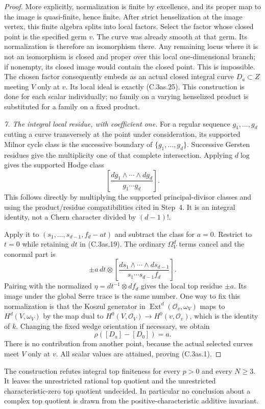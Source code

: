 \begin{proof}
More explicitly, normalization is finite by excellence,
and its proper map to the image is quasi-finite, hence
finite. After strict henselization at the image vertex,
this finite algebra splits into local factors. Select
the factor whose closed point is the specified germ $v$.
The curve was already smooth at that germ. Its normalization
is therefore an isomorphism there. Any remaining locus
where it is not an isomorphism is closed and proper over
this local one-dimensional branch; if nonempty, its closed
image would contain the closed point. This is impossible.
The chosen factor consequently embeds as an actual closed
integral curve $D_a\subset Z$ meeting $V$ only at $v$.
Its local ideal is exactly (C.3as.25).
This construction is done for each scalar individually;
no family on a varying henselized product is substituted
for a family on a fixed product.

\emph{7. The integral local residue, with coefficient one.}
For a regular sequence $g_1,\ldots,g_d$ cutting a curve
transversely at the point under consideration, its supported
Milnor cycle class is the successive boundary of
$\{g_1,\ldots,g_d\}$. Successive Gersten residues give
the multiplicity one of that complete intersection.
Applying $d\log$ gives the supported Hodge class
\[
                 \left[\frac{dg_1\wedge\cdots\wedge dg_d}
                                   {g_1\cdots g_d}\right].
 \tag{C.3as.26}
\]
This follows directly by multiplying the supported
principal-divisor classes and using the product/residue
compatibilities cited in Step~4. It is an integral identity,
not a Chern character divided by $(d-1)!$.

Apply it to
$(s_1,\ldots,s_{d-1},f_d-at)$ and subtract the class for
$a=0$. Restrict to $t=0$ while retaining $dt$ in
(C.3as.19). The ordinary $\Omega^d_V$ terms cancel and
the conormal part is
\[
 \pm a\,dt\otimes
       \left[\frac{ds_1\wedge\cdots\wedge ds_{d-1}}
                         {s_1\cdots s_{d-1}f_d}\right].
 \tag{C.3as.27}
\]
Pairing with the normalized $\eta=dt^{-1}\otimes df_d$
gives the local top residue $\pm a$. Its image under
the global Serre trace is the same number. One way to
fix this normalization is that the Koszul generator
in $\operatorname{Ext}^d(\mathcal O_v,\omega_V)$ maps
to $H^d(V,\omega_V)$ by the map dual to
$H^0(V,\mathcal O_V)\to H^0(v,\mathcal O_v)$, which
is the identity of $k$. Changing the fixed wedge
orientation if necessary, we obtain
\[
                        \rho([D_a]-[D_0])=a .
 \tag{C.3as.28}
\]
There is no contribution from another point, because
the actual selected curves meet $V$ only at $v$.
All scalar values are attained, proving (C.3as.1).
\end{proof}

The construction refutes integral top finiteness for every $p>0$
and every $N\ge3$. It leaves the unrestricted rational top quotient
and the unrestricted characteristic-zero top quotient undecided.
In particular no conclusion about a complex top quotient is drawn
from the positive-characteristic additive invariant.
